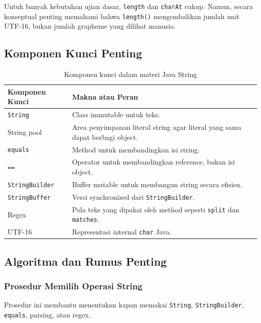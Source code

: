 Untuk banyak kebutuhan ujian dasar, \texttt{length} dan \texttt{charAt} cukup. Namun, secara konseptual penting memahami bahwa \texttt{length()} mengembalikan jumlah unit UTF-16, bukan jumlah grapheme yang dilihat manusia.

\subsection{Komponen Kunci Penting}

\begin{table}[H]
\centering
\begin{tabularx}{\textwidth}{|L{0.28\textwidth}|X|}
\hline
\textbf{Komponen Kunci} & \textbf{Makna atau Peran} \\
\hline
\texttt{String} & Class immutable untuk teks. \\
\hline
String pool & Area penyimpanan literal string agar literal yang sama dapat berbagi object. \\
\hline
\texttt{equals} & Method untuk membandingkan isi string. \\
\hline
\texttt{==} & Operator untuk membandingkan reference, bukan isi object. \\
\hline
\texttt{StringBuilder} & Buffer mutable untuk membangun string secara efisien. \\
\hline
\texttt{StringBuffer} & Versi synchronized dari \texttt{StringBuilder}. \\
\hline
Regex & Pola teks yang dipakai oleh method seperti \texttt{split} dan \texttt{matches}. \\
\hline
UTF-16 & Representasi internal \texttt{char} Java. \\
\hline
\end{tabularx}
\caption{Komponen kunci dalam materi Java String}
\label{tab:komponen-kunci-java-string}
\end{table}

\subsection{Algoritma dan Rumus Penting}

\subsubsection{Prosedur Memilih Operasi String}

\begin{jawab}
Prosedur ini membantu menentukan kapan memakai \texttt{String}, \texttt{StringBuilder}, \texttt{equals}, parsing, atau regex.
\end{jawab}

